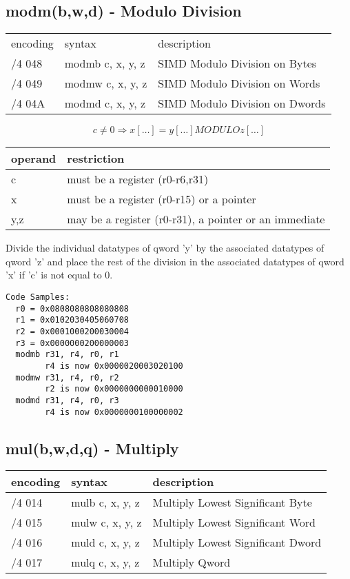 \documentclass[letterpaper,10pt,openright,twoside,onecolumn]{book}
\begin{document}
  

\newpage\subsection{modm(b,w,d) - Modulo Division}
  \begin{tabular}{|l|l|l|}
   \hline
    encoding & syntax & description \\
    /4 048 & modmb c, x, y, z & SIMD Modulo Division on Bytes \\
    /4 049 & modmw c, x, y, z & SIMD Modulo Division on Words \\
    /4 04A & modmd c, x, y, z & SIMD Modulo Division on Dwords \\
   \hline
   \hline
  \end{tabular}

  \begin{displaymath} c \neq 0 \Rightarrow x[\ldots] = y[\ldots] MODULO z[\ldots]\end{displaymath}

  \flushleft
  \begin{tabular}{|l|l|}
   \hline
    operand & restriction \\
   \hline
    c & must be a register (r0-r6,r31) \\
    x & must be a register (r0-r15) or a pointer \\
    y,z & may be a register (r0-r31), a pointer or an immediate \\
   \hline
  \end{tabular}

  Divide the individual datatypes of qword 'y' by the associated datatypes of
  qword 'z' and place the rest of the division in the associated datatypes of qword 'x' if 'c' is not equal to 0.

  \begin{verbatim}
Code Samples:
  r0 = 0x0808080808080808
  r1 = 0x0102030405060708
  r2 = 0x0001000200030004
  r3 = 0x0000000200000003
  modmb r31, r4, r0, r1
        r4 is now 0x0000020003020100
  modmw r31, r4, r0, r2
        r2 is now 0x0000000000010000
  modmd r31, r4, r0, r3
        r4 is now 0x0000000100000002
  \end{verbatim}

\newpage\subsection{mul(b,w,d,q) - Multiply}
  \begin{tabular}{|l|l|l|}
   \hline
    encoding & syntax & description \\
   \hline
    /4 014 & mulb c, x, y, z & Multiply Lowest Significant Byte \\
    /4 015 & mulw c, x, y, z & Multiply Lowest Significant Word \\
    /4 016 & muld c, x, y, z & Multiply Lowest Significant Dword \\
    /4 017 & mulq c, x, y, z & Multiply Qword \\
   \hline
  \end{tabular}
\end{document}
